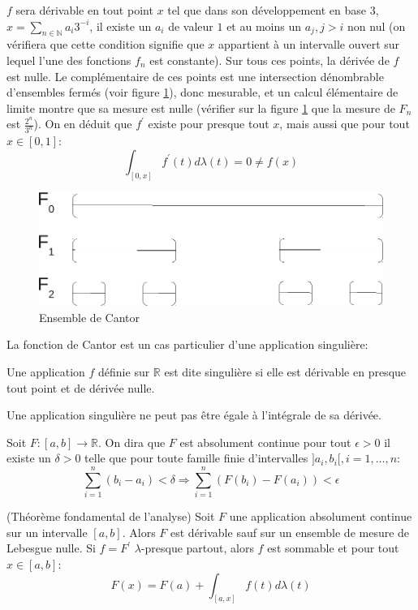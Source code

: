 $f$ sera
dérivable en tout point $x$ tel que dans son développement en base $3$, $x=\sum_{n \in \mathbb{N}}
a_i 3^{-i}$, il existe un $a_i$ de valeur $1$ et au moins un $a_j, j > i$ non
nul (on vérifiera que cette condition signifie que $x$ appartient à un
intervalle ouvert sur lequel l'une des fonctions $f_n$ est constante). Sur tous
ces points, la dérivée de $f$ est nulle. Le complémentaire de ces points est une
intersection dénombrable d'ensembles fermés (voir figure \ref{ch6:fig2}), donc
mesurable, et un calcul élémentaire de limite montre que sa mesure est nulle (vérifier sur la
figure \ref{ch6:fig2} que la mesure de $F_n$ est $\frac{2^n}{3^n}$). On en déduit que
$f^\prime$ existe pour presque tout $x$, mais aussi que pour tout $x \in [0,1]$:
\[
\int_{[0,x]} f^\prime(t) d \lambda(t) = 0 \neq f(x)
\]
\begin{figure}[hb]
\begin{center}
\includegraphics[scale=0.5]{images/ens_cantor.pdf}
\caption{Ensemble de Cantor}\label{ch6:fig2}
\end{center}
\end{figure}
La fonction de Cantor est un cas particulier d'une application singulière:
\begin{defn}
Une application $f$ définie sur $\mathbb{R}$ est dite singulière si elle est
dérivable en presque tout point et de dérivée nulle.
\end{defn}
Une application singulière ne peut pas être égale à l'intégrale de sa
dérivée.
\begin{defn}
Soit $F \colon [a,b] \to \mathbb{R}$. On dira que $F$ est absolument continue
pour tout $\epsilon > 0$ il existe un $\delta > 0$ telle que pour toute famille
finie d'intervalles $]a_i, b_i[, i = 1, \dots, n$:
\[
\sum_{i=1}^n (b_i - a_i) < \delta \Rightarrow \sum_{i=1}^n
\left(F(b_i)-F(a_i)\right) < \epsilon
\]
\end{defn}
\begin{mandatory}
\begin{theorem}{(Théorème fondamental de l'analyse)}
Soit $F$ une application absolument continue sur un intervalle $[a,b]$. Alors
$F$ est dérivable sauf sur un ensemble de mesure de Lebesgue nulle. Si
$f=F^\prime$ $\lambda$-presque partout, alors $f$ est sommable et pour tout $x
\in [a,b]$:
\[
F(x) = F(a) + \int_{[a,x]} f(t) d \lambda(t)
\]
\end{theorem}
\end{mandatory}
